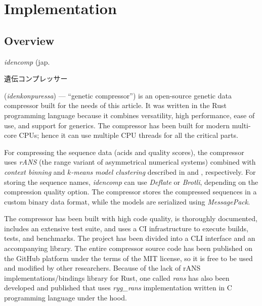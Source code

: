 \section{Implementation}\label{sec:implementation}

\subsection{Overview}\label{subsec:overview}

\emph{idencomp} (jap.\hspace{0.2em}\begin{CJK}{UTF8}{min}
                                       遺伝コンプレッサー
\end{CJK}
(\emph{idenkonpuressa}) --- ``genetic compressor'') is an open-source genetic
data
compressor built for the needs of this article.
It was written in the Rust programming language\cite{rust} because it combines
versatility, high performance, ease of use, and support for generics.
The compressor has been built for modern multi-core CPUs; hence it can use
multiple CPU threads for all the critical parts.

For compressing the sequence data (acids and quality scores), the compressor
uses \emph{rANS} (the range variant of asymmetrical numerical systems)\cite{7170048}
combined with \emph{context binning} and \emph{\(k\)-means model clustering}
described in  and
, respectively.
For storing the sequence names, \emph{idencomp} can use
\emph{Deflate}\cite{rfc1951} or
\emph{Brotli}\cite{rfc7932}, depending on the compression quality option.
The compressor stores the compressed sequences in a custom binary data
format, while the models are serialized using \emph{MessagePack}\cite{messagepack}.

The compressor has been built with high code quality, is thoroughly
documented, includes an extensive test suite, and uses a CI infrastructure to
execute builds, tests, and benchmarks.
The project has been divided into a CLI interface and an accompanying library.
The entire compressor source code has been published on the GitHub
platform\cite{idencomp} under the terms of the MIT license, so it is free to be
used and modified by other researchers.
Because of the lack of rANS implementations/bindings library for Rust, one
called \emph{rans} has also been developed and published\cite{rans-rs} that uses
\emph{ryg\_rans}\cite{ryg-rans} implementation written in C programming language under the hood.

